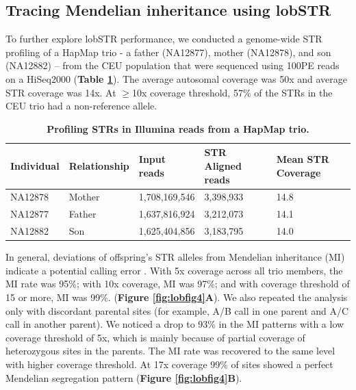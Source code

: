 \subsection{Tracing Mendelian inheritance using lobSTR}
To further explore lobSTR performance, we conducted a genome-wide STR profiling of a HapMap trio - a father (NA12877), mother (NA12878), and son (NA12882) -- from the CEU population that were sequenced using 100PE reads on a HiSeq2000 (\textbf{Table \ref{tab:lobtab2}}). The average autosomal coverage was 50x and average STR coverage was 14x. At $\geq$10x coverage threshold, 57\% of the STRs in the CEU trio had a non-reference allele. 

\begin{table}
\centering
\label{tab:lobtab2}
\begin{tabular}{l l l l l}
\hline
Individual	& Relationship & Input reads	& STR Aligned reads	& Mean STR Coverage \\
\hline
NA12878 &	Mother	& 1,708,169,546 &	3,398,933 &	14.8 \\
NA12877	& Father &	1,637,816,924	&3,212,073 &	14.1 \\
NA12882	& Son	& 1,625,404,856 &	3,183,795 &	14.0 \\
\hline
\end{tabular}
\caption{\textbf{Profiling STRs in Illumina reads from a HapMap trio.}}
\end{table}

In general, deviations of offspring's STR alleles from Mendelian inheritance (MI) indicate a potential calling error \cite{EwenBahloTreloarEtAl2000}. With 5x coverage across all trio members, the MI rate was 95\%; with 10x coverage, MI was 97\%; and with coverage threshold of 15 or more, MI was 99\%. (\textbf{Figure \ref{fig:lobfig4}A}). We also repeated the analysis only with discordant parental sites (for example, A/B call in one parent and A/C call in another parent). We noticed a drop to 93\% in the MI patterns with a low coverage threshold of 5x, which is mainly because of partial coverage of heterozygous sites in the parents. The MI rate was recovered to the same level with higher coverage threshold. At 17x coverage 99\% of sites showed a perfect Mendelian segregation pattern (\textbf{Figure \ref{fig:lobfig4}B}). 

